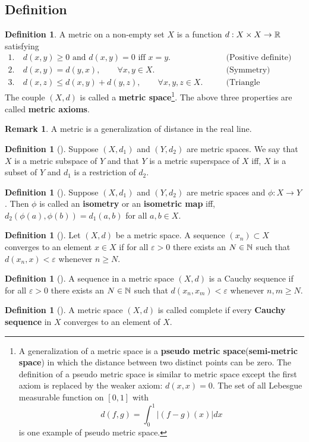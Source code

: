 \documentclass[	DIV=calc,paper=a4,fontsize=11pt]{scrartcl}	 	%
\theoremstyle{definition}
\newtheorem{defn}[thm]{Definition}
\newtheorem{rem}[thm]{Remark}
\theoremstyle{plain}
\theoremstyle{remark}
\begin{document}
\subsection{Definition}
\begin{defn}
A metric on a non-empty set $X$ is a function  $d: X\times X \rightarrow \Bbb R$ satisfying
\begin{align*}
  1.\ &d(x,y)\geq0 \text{ and } d(x,y)=0 \text{ iff } x=y.\qquad & \text{(Positive definite)}\\
  2.\ &d(x,y)=d(y,x), \qquad \forall x,y\in X. \qquad & \text{(Symmetry)}\\
  3.\ &d(x,z)\leq d(x,y)+d(y,z), \qquad \forall x,y,z\in X. \qquad & \text{(Triangle inequality)}
\end{align*}
The couple $(X,d)$ is called a \textbf{metric space}\footnote{A generalization of a metric space is a \textbf{pseudo metric space}(\textbf{semi-metric space}) in which the distance between two distinct points can be zero. The definition of a pseudo metric space is similar to metric space except the first axiom is replaced by the weaker axiom: $d(x,x)=0$. The set of all Lebesgue measurable function on $[0,1]$ with $$d(f,g)=\int_{0}^{1}|(f-g)(x)|dx$$ is one example of pseudo metric space.}. The above three properties are called \textbf{metric axioms}.
\end{defn}
\begin{rem}\color{red}
A metric is a generalization of distance in the real line.
\end{rem}

\begin{defn}[\textbf{\color{blue}{Metric Subspaces}}]
Suppose $(X, d_1)$ and $(Y, d_2)$ are metric spaces. We say that $X$ is a metric subspace of $Y$ and that $Y$ is a metric superspace of $X$ iff, $X$ is a subset of $Y$ and $d_1$ is a restriction of $d_2$.
\end{defn}

\begin{defn}[\textbf{\color{blue}{Isometry}}]
Suppose $(X, d_1)$ and $(Y, d_2)$ are metric spaces and $\phi: X\to Y$ . Then $\phi$ is called an \textbf{isometry} or an \textbf{isometric map} iff, $d_2(\phi(a), \phi(b)) = d_1(a, b)$ for all $a, b\in X$.
\end{defn}

\begin{defn}[\textbf{\color{blue}{Convergence}}]
Let $(X, d)$ be a metric space. A sequence $(x_n)\subset X$ converges to an element $x \in X$ if for all $\varepsilon > 0$ there exists an $N\in\Bbb N$ such that $d(x_n, x) < \varepsilon $ whenever $n\ge N$.
\end{defn}
\begin{defn}[\textbf{\color{blue}{Cauchy sequence}}]
A sequence in a metric space $(X, d)$ is a Cauchy sequence if for all $\varepsilon > 0$ there exists an $N\in\Bbb N$
such that $d(x_n, x_m) <\varepsilon$ whenever $n, m \ge N$.
\end{defn}
\begin{defn}[\textbf{\color{blue}{Complete}}]
A metric space $(X, d)$ is called complete if every \textbf{Cauchy sequence} in $X$ converges to an element of $X$.
\end{defn}
\end{document}

